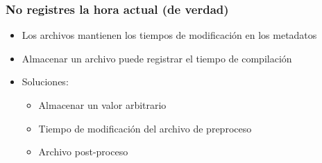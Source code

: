 \documentclass[14pt,aspectratio=169]{beamer}
\begin{document}
\begin{frame}[plain]
\end{frame}

\begin{frame}[fragile]
 \frametitle{No registres la hora actual (de verdad)}

 \begin{itemize}
  \item Los archivos mantienen los tiempos de modificación en los metadatos
  \item Almacenar un archivo puede registrar el tiempo de compilación
  \item<2-> Soluciones:
   \begin{itemize}
    \item Almacenar un valor arbitrario
    \item<3-> Tiempo de modificación del archivo de preproceso
    \item<4> Archivo post-proceso
   \end{itemize}
 \end{itemize}

 \begin{example}
\begin{semiverbatim}
\end{semiverbatim}
 \end{example}
\end{frame}
\end{document}
